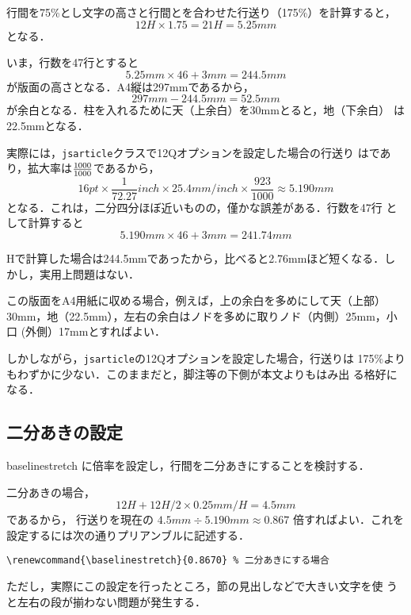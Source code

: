 \documentclass[a4j, twocolumn, twoside, draft]{jsarticle}
\newcommand{\cmd}[1]{\texttt{\symbol{"5C}#1}} %
\begin{document}
  行間を75\%とし文字の高さと行間とを合わせた行送り（175\%）を計算すると，
  \[
   12H \times 1.75 = 21H = 5.25 mm
  \]
  となる．

  いま，行数を47行とすると
  \[
   5.25 mm \times 46 + 3mm = 244.5mm
  \]
  が版面の高さとなる．A4縦は297mmであるから，
  \[
   297mm - 244.5mm = 52.5mm
  \]
  が余白となる．柱を入れるために天（上余白）を30mmとると，地（下余白）
  は22.5mmとなる．

  実際には，\texttt{jsarticle}クラスで12Qオプションを設定した場合の行送り
  は\the\baselineskip であり，拡大率は$\frac{\the\mag}{1000}$であるから，
  \[
    16 pt \times \frac{1}{72.27} inch \times 25.4 mm/inch \times
    \frac{923}{1000} \approx 5.190 mm
  \]
  となる．これは，二分四分ほぼ近いものの，僅かな誤差がある．行数を47行
  として計算すると
  \[
   5.190 mm \times 46 + 3mm = 241.74mm
  \]

  Hで計算した場合は244.5mmであったから，比べると2.76mmほど短くなる．し
  かし，実用上問題はない．

この版面をA4用紙に収める場合，例えば，上の余白を多めにして天（上部）
30mm，地（22.5mm），左右の余白はノドを多めに取りノド（内側）25mm，小口
(外側）17mmとすればよい．

しかしながら，\texttt{jsarticle}の12Qオプションを設定した場合，行送りは
175\%よりもわずかに少ない．このままだと，脚注等の下側が本文よりもはみ出
る格好になる．


  
\subsection{二分あきの設定}
  baselinestretch に倍率を設定し，行間を二分あきにすることを検討する．
  
  二分あきの場合，
  \[ 12H + 12H/2 \times 0.25mm/H= 4.5mm\]であるから，
  行送りを現在の
  $4.5mm \div 5.190mm \approx 0.867$
  倍すればよい．これを設定するには次の通りプリアンブルに記述する．

{\small
\begin{verbatim}
\renewcommand{\baselinestretch}{0.8670} % 二分あきにする場合
\end{verbatim}
}

  ただし，実際にこの設定を行ったところ，節の見出しなどで大きい文字を使
  うと左右の段が揃わない問題が発生する．
\end{document}
